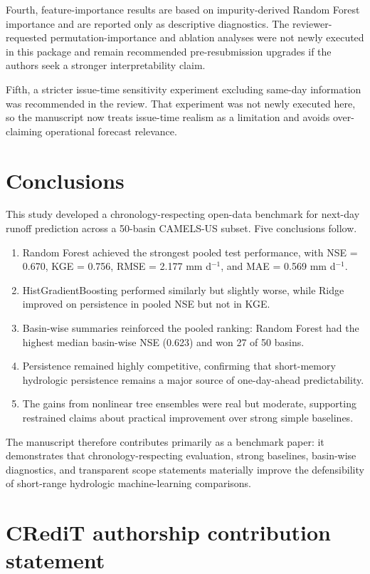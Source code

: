 \documentclass[preprint,12pt,authoryear]{elsarticle}
\begin{document}
Fourth, feature-importance results are based on impurity-derived Random Forest importance and are reported only as descriptive diagnostics. The reviewer-requested permutation-importance and ablation analyses were not newly executed in this package and remain recommended pre-resubmission upgrades if the authors seek a stronger interpretability claim.

Fifth, a stricter issue-time sensitivity experiment excluding same-day information was recommended in the review. That experiment was not newly executed here, so the manuscript now treats issue-time realism as a limitation and avoids over-claiming operational forecast relevance.

\section{Conclusions}

This study developed a chronology-respecting open-data benchmark for next-day runoff prediction across a 50-basin CAMELS-US subset. Five conclusions follow.

\begin{enumerate}
\item Random Forest achieved the strongest pooled test performance, with NSE = 0.670, KGE = 0.756, RMSE = 2.177 mm d$^{-1}$, and MAE = 0.569 mm d$^{-1}$.
\item HistGradientBoosting performed similarly but slightly worse, while Ridge improved on persistence in pooled NSE but not in KGE.
\item Basin-wise summaries reinforced the pooled ranking: Random Forest had the highest median basin-wise NSE (0.623) and won 27 of 50 basins.
\item Persistence remained highly competitive, confirming that short-memory hydrologic persistence remains a major source of one-day-ahead predictability.
\item The gains from nonlinear tree ensembles were real but moderate, supporting restrained claims about practical improvement over strong simple baselines.
\end{enumerate}

The manuscript therefore contributes primarily as a benchmark paper: it demonstrates that chronology-respecting evaluation, strong baselines, basin-wise diagnostics, and transparent scope statements materially improve the defensibility of short-range hydrologic machine-learning comparisons.

\section*{CRediT authorship contribution statement}
\end{document}
